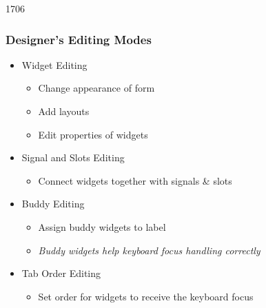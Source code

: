 \begin{slide}{1706}\frametitle{Designer's Editing Modes}
  \begin{itemize}
  \item {} Widget Editing 
    \begin{itemize}
    \item Change appearance of form
    \item Add layouts
    \item Edit properties of widgets
    \end{itemize}
  \item {} Signal and Slots Editing 
    \begin{itemize}
    \item Connect widgets together with signals \& slots
    \end{itemize}
 \item {} Buddy Editing
   \begin{itemize}
   \item Assign buddy widgets to label
   \item \textit{Buddy widgets help keyboard focus handling correctly}
   \end{itemize}
  \item {} Tab Order Editing
    \begin{itemize}
    \item Set order for widgets to receive the keyboard focus
    \end{itemize}

 \end{itemize}  
\end{slide}


